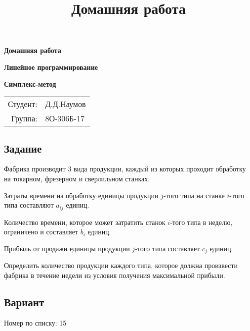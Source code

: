 \documentclass{article}
\title{Домашняя работа}
\date{}
\begin{document}
\begin{titlepage}

\vspace{100pt}
\begin{center}
    \huge \textbf{Домашняя работа}

    \vspace{50pt}
    
    \huge \textbf{Линейное программирование}
    
    \vspace{30pt}
    
    \huge \textbf{Симплекс-метод}
\end{center}
\begin{flushright}

\vspace{350pt}
\begin{tabular}{rl}
     \Large Студент: & \Large Д.Д.Наумов \\
     \Large Группа: & \Large 8О-306Б-17 \\
\end{tabular}
\end{flushright}
\end{titlepage}

\setcounter{section}{0}
\subsection*{Задание}

Фабрика производит 3 вида продукции, каждый из которых проходит обработку на токарном, фрезерном и сверлильном станках.

Затраты времени на обработку единицы продукции $j$-того типа на станке $i$-того типа составляют $a_{ij}$ единиц. 

Количество времени, которое может затратить станок $i$-того типа в неделю, ограничено и составляет $b_i$  единиц.

Прибыль от продажи единицы продукции $j$-того типа составляет $c_j$ единиц. 

Определить количество продукции каждого типа, которое должна произвести фабрика в течение недели из условия получения максимальной прибыли.
\subsection*{Вариант}
Номер по списку: 15

\end{document}
